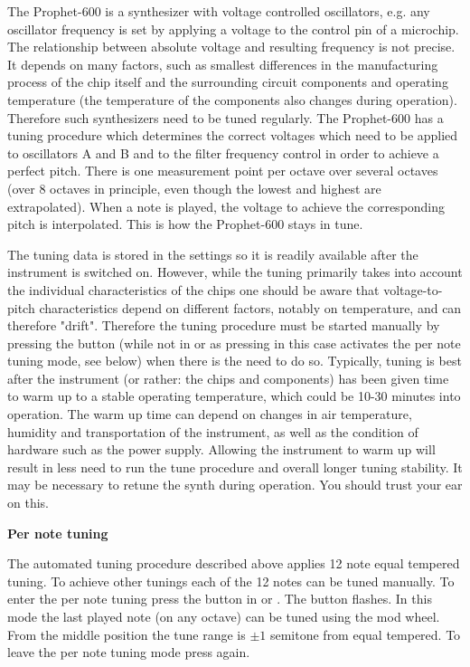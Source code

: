 The Prophet-600 is a synthesizer with voltage controlled oscillators, e.g. any oscillator frequency is set by applying a voltage to the control pin of a microchip. The relationship between absolute voltage and resulting frequency is not precise. It depends on many factors, such as smallest differences in the manufacturing process of the chip itself and the surrounding circuit components and operating temperature (the temperature of the components also changes during operation). Therefore such synthesizers need to be tuned regularly.  The Prophet-600 has a tuning procedure which determines the correct voltages which need to be applied to oscillators A and B and to the filter frequency control in order to achieve a perfect pitch. There is one measurement point per octave over several octaves (over 8 octaves in principle, even though the lowest and highest are extrapolated). When a note is played, the voltage to achieve the corresponding pitch is interpolated. This is how the Prophet-600 stays in tune. 

The tuning data is stored in the settings so it is readily available after the instrument is switched on. However, while the tuning primarily takes into account the individual characteristics of the chips one should be aware that voltage-to-pitch characteristics depend on different factors, notably on temperature, and can therefore "drift". Therefore the tuning procedure must be started manually by pressing the \tune button (while not in \shiftmode or \shiftlock as pressing \tune in this case activates the per note tuning mode, see below) when there is the need to do so. Typically, tuning is best after the instrument (or rather: the chips and components) has been given time to warm up to a stable operating temperature, which could be 10-30 minutes into operation. The warm up time can depend on changes in air temperature, humidity and transportation of the instrument, as well as the condition of hardware such as the power supply.  Allowing the instrument to warm up will result in less need to run the tune procedure and overall longer tuning stability. It may be necessary to retune the synth during operation. You should trust your ear on this.

\textbf{Per note tuning}

The automated tuning procedure described above applies 12 note equal tempered tuning. To achieve other tunings each of the 12 notes can be tuned manually. To enter the per note tuning press the \tune button in \shiftmode or \shiftlock. The \tune button flashes. In this mode the last played note (on any octave) can be tuned using the mod wheel. From the middle position the tune range is $\pm 1$ semitone from equal tempered. To leave the per note tuning mode press \tune again.

